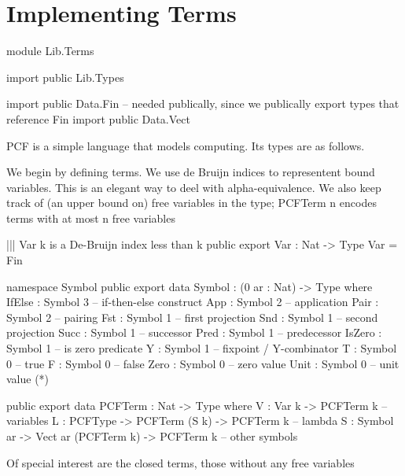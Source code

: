 \section{Implementing Terms}

\begin{hidden}
module Lib.Terms

import public Lib.Types

import public Data.Fin  -- needed publically, since we publically export types that reference Fin
import public Data.Vect

\end{hidden}

PCF is a simple language that models computing. Its types are as follows.


We begin by defining terms. We use de Bruijn indices to representent bound
variables. This is an elegant way to deel with alpha-equivalence.
We also keep track of (an upper bound on) free variables in the type;
PCFTerm n encodes terms with at most n free variables

\begin{code}
||| Var k is a De-Bruijn index less than k
public export
Var : Nat -> Type
Var = Fin

namespace Symbol
  public export
  data Symbol : (0 ar : Nat) -> Type where
    IfElse : Symbol 3       -- if-then-else construct
    App    : Symbol 2       -- application
    Pair   : Symbol 2       -- pairing
    Fst    : Symbol 1       -- first projection
    Snd    : Symbol 1       -- second projection
    Succ   : Symbol 1       -- successor
    Pred   : Symbol 1       -- predecessor
    IsZero : Symbol 1       -- is zero predicate
    Y      : Symbol 1       -- fixpoint / Y-combinator
    T      : Symbol 0       -- true
    F      : Symbol 0       -- false
    Zero   : Symbol 0       -- zero value
    Unit   : Symbol 0       -- unit value (*)
\end{code}

\begin{code}
public export
data PCFTerm : Nat -> Type where
  V    : Var k -> PCFTerm k                             -- variables
  L    : PCFType   -> PCFTerm (S k) -> PCFTerm k        -- lambda
  S    : Symbol ar -> Vect ar (PCFTerm k) -> PCFTerm k  -- other symbols
\end{code}

Of special interest are the closed terms, those without any free variables

